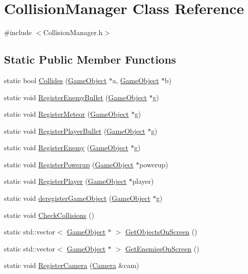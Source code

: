 \hypertarget{class_collision_manager}{}\section{Collision\+Manager Class Reference}
\label{class_collision_manager}


{\ttfamily \#include $<$Collision\+Manager.\+h$>$}

\subsection*{Static Public Member Functions}
\begin{DoxyCompactItemize}
\item 
static bool \hyperlink{class_collision_manager_aa9b79541a4307b66c82f3d7317c5cd05}{Collides} (\hyperlink{class_game_object}{Game\+Object} $\ast$a, \hyperlink{class_game_object}{Game\+Object} $\ast$b)
\item 
static void \hyperlink{class_collision_manager_ab7a081fdf66095154b83df5849064353}{Register\+Enemy\+Bullet} (\hyperlink{class_game_object}{Game\+Object} $\ast$g)
\item 
static void \hyperlink{class_collision_manager_a26e2211bb479786aa286e27725047426}{Register\+Meteor} (\hyperlink{class_game_object}{Game\+Object} $\ast$g)
\item 
static void \hyperlink{class_collision_manager_a95a12017947b40b2faf8f6b860124608}{Register\+Player\+Bullet} (\hyperlink{class_game_object}{Game\+Object} $\ast$g)
\item 
static void \hyperlink{class_collision_manager_ac3abdbcb7fa79059bf44ceffc56a88d9}{Register\+Enemy} (\hyperlink{class_game_object}{Game\+Object} $\ast$g)
\item 
static void \hyperlink{class_collision_manager_ac68a7240e24d4744b2aca2082482bc61}{Register\+Powerup} (\hyperlink{class_game_object}{Game\+Object} $\ast$powerup)
\item 
static void \hyperlink{class_collision_manager_a33a480a6e9e10810e5bb59d486c1b54a}{Register\+Player} (\hyperlink{class_game_object}{Game\+Object} $\ast$player)
\item 
static void \hyperlink{class_collision_manager_a96f0e816e92567c5563d6cc095203e92}{deregister\+Game\+Object} (\hyperlink{class_game_object}{Game\+Object} $\ast$g)
\item 
static void \hyperlink{class_collision_manager_aa1c1b2c09960c0bad6b9c980324f9f92}{Check\+Collisions} ()
\item 
static std\+::vector$<$ \hyperlink{class_game_object}{Game\+Object} $\ast$ $>$ \hyperlink{class_collision_manager_aae72acb1f514ba8ef4a3b7e5e9a82291}{Get\+Objects\+On\+Screen} ()
\item 
static std\+::vector$<$ \hyperlink{class_game_object}{Game\+Object} $\ast$ $>$ \hyperlink{class_collision_manager_a9edffbdcca1e34b3fb326ab8addec480}{Get\+Enemies\+On\+Screen} ()
\item 
static void \hyperlink{class_collision_manager_ad0c0a951de17cc2fc6ffceffd56784dd}{Register\+Camera} (\hyperlink{class_camera}{Camera} \&cam)
\end{DoxyCompactItemize}


